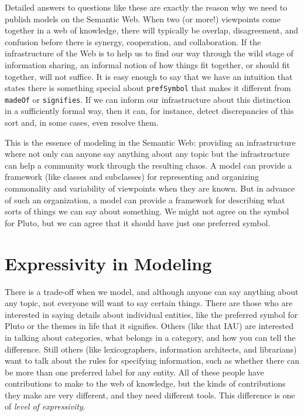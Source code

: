 Detailed answers to questions like these are exactly the reason why we
need to publish models on the Semantic Web. When two (or more!)
viewpoints come together in a web of knowledge, there will typically be
overlap, disagreement, and confusion before there is synergy,
cooperation, and collaboration. If the infrastructure of the Web is to
help us to find our way through the wild stage of information sharing,
an informal notion of how things fit together, or should fit together,
will not suffice. It is easy enough to say that we have an intuition
that states there is something special about \texttt{prefSymbol} that makes it
different from \texttt{madeOf} or \texttt{signifies}. If we can inform our 
infrastructure about this distinction in a sufficiently formal way, then it
can, for instance, detect discrepancies of this sort and, in some cases,
even resolve them.

This is the essence of modeling in the Semantic Web: providing an
infrastructure where not only can anyone say anything about any topic
but the infrastructure can help a community work through the resulting
chaos. A model can provide a framework (like classes and subclasses) for
representing and organizing commonality and variability of viewpoints
when they are known. But in advance of such an organization, a model can
provide a framework for describing what sorts of things we can say about
something. We might not agree on the symbol for Pluto, but we can agree
that it should have just one preferred symbol.

\section{Expressivity in Modeling}

There is a trade-off when we model, and although anyone can say anything
about any topic, not everyone will want to say certain things. There are
those who are interested in saying details about individual entities,
like the preferred symbol for Pluto or the themes in life that it
signifies. Others (like that IAU) are interested in talking about
categories, what belongs in a category, and how you can tell the
difference. Still others (like lexicographers, information architects,
and librarians) want to talk about the rules for specifying information,
such as whether there can be more than one preferred label for any
entity. All of these people have contributions to make to the web of
knowledge, but the kinds of contributions they make are very different,
and they need different tools. This difference is one of \emph{level of
expressivity}.



